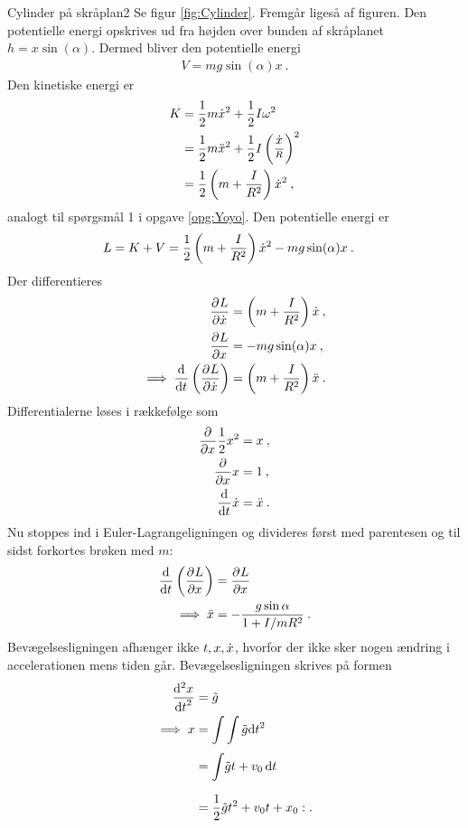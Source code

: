 %
%
\begin{opgave}{Cylinder på skråplan}{2}
\opg Se figur \ref{fig:Cylinder}.
\opg Fremgår ligeså af figuren.
\opg Den potentielle energi opskrives ud fra højden over bunden af skråplanet $h = x\sin(\alpha)$. Dermed bliver den potentielle energi
\begin{align*}
	V = mg\sin(\alpha)x \: .
\end{align*}
\opg Den kinetiske energi er
\begin{align*}
	K &= \frac{1}{2}m\dt{x}^2 + \frac{1}{2}I\omega^2 \\
	&= \frac{1}{2}m\ddt{x}^2 + \frac{1}{2}I\left(\frac{\dt{x}}{^R}\right)^2 \\
	&= \frac{1}{2}\left(m+\frac{I}{R^2}\right)\dt{x}^2 \: ,
\end{align*}
analogt til spørgsmål 1 i opgave \ref{opg:Yoyo}.
\opg Den potentielle energi er
\begin{align*}
	L &= K + V = \frac{1}{2}\left(m+\frac{I}{R^2}\right)\dt{x}^2 - mg\sin(\alpha)x \: .
\end{align*}
\opg Der differentieres
\begin{align*}
	\pdif{\dt{x}}{L} &= \left(m+\frac{I}{R^2}\right)\dt{x} \: , \\
	\pdif{x}{L} &= -mg\sin(\alpha)x \: , \\
	\implies \el{\dt{x}} &= \left(m+\frac{I}{R^2}\right)\ddt{x} \: .
\end{align*}
Differentialerne løses i rækkefølge som
\begin{align*}
	\pdif{x}{}\frac{1}{2}x^2 &= x \: ,\\
	\pdif{x}{}x &= 1 \: ,\\
	\dif{t}{}\dt{x} &= \ddt{x} \: .
\end{align*}
Nu stoppes ind i Euler-Lagrangeligningen og divideres først med parentesen og til sidst forkortes brøken med $m$:
\begin{align*}
	\el{x} &= \pdif{x}{L} \\
	\implies \ddt{x} &= -\frac{g\sin\alpha}{1+I/mR^2} \: .
\end{align*}
\opg Bevægelsesligningen afhænger ikke $t,x,\dt{x}$, hvorfor der ikke sker nogen ændring i accelerationen mens tiden går.
\opg Bevægelsesligningen skrives på formen
\begin{align*}
	\dif[2]{t}{x} &= \tilde{g} \\
	\implies x &= \int\int\tilde{g}\d t^2 \\ 
	&= \integral{\tilde{g}t + v_0}{t}{}{} \\
	&= \frac{1}{2}\tilde{g}t^2 + v_0t + x_0 : .
\end{align*}
\end{opgave}
